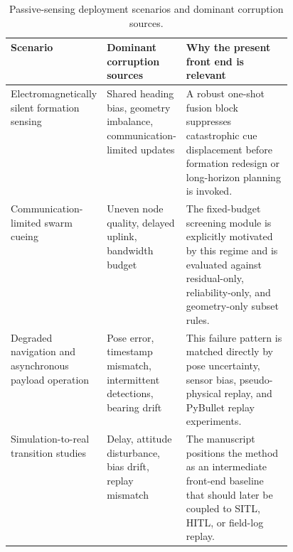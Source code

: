 \begin{table}[!htbp]
\centering
\caption{Passive-sensing deployment scenarios and dominant corruption sources.}
\label{tab:deploymain}
\small
\setlength{\tabcolsep}{4pt}
\begin{tabularx}{\linewidth}{>{\RaggedRight\arraybackslash}p{0.23\linewidth} >{\RaggedRight\arraybackslash}p{0.23\linewidth} X}
\toprule
Scenario & Dominant corruption sources & Why the present front end is relevant \\
\midrule
Electromagnetically silent formation sensing \cite{li2025bearing,huang2025emcompat} & Shared heading bias, geometry imbalance, communication-limited updates & A robust one-shot fusion block suppresses catastrophic cue displacement before formation redesign or long-horizon planning is invoked. \\
Communication-limited swarm cueing \cite{xing2025node,zhou2026target} & Uneven node quality, delayed uplink, bandwidth budget & The fixed-budget screening module is explicitly motivated by this regime and is evaluated against residual-only, reliability-only, and geometry-only subset rules. \\
Degraded navigation and asynchronous payload operation \cite{chen2025research,peng2024trajectory} & Pose error, timestamp mismatch, intermittent detections, bearing drift & This failure pattern is matched directly by pose uncertainty, sensor bias, pseudo-physical replay, and PyBullet replay experiments. \\
Simulation-to-real transition studies \cite{panerati2021learning,perezsegui2023bridging} & Delay, attitude disturbance, bias drift, replay mismatch & The manuscript positions the method as an intermediate front-end baseline that should later be coupled to SITL, HITL, or field-log replay. \\
\bottomrule
\end{tabularx}
\end{table}
